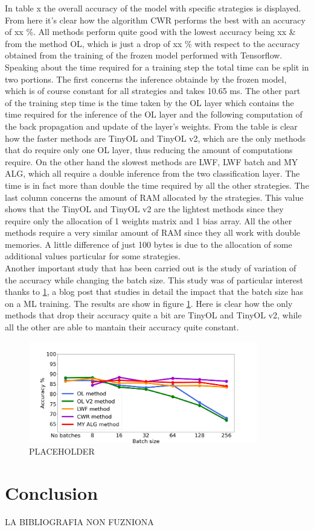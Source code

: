 \documentclass[12pt]{report}
\begin{document}
In table x the overall accuracy of the model with specific strategies is displayed. From here it's clear how the algorithm CWR performs the best with an accuracy of xx \%. All methods perform quite good with the lowest accuracy being xx \& from the method OL, which is just a drop of xx \% with respect to the accuracy obtained from the training of the frozen model performed with Tensorflow. Speaking about the time required for a training step the total time can be split in two portions. The first concerns the inference obtainde by the frozen model, which is of course constant for all strategies and takes 10.65 ms. The other part of the training step time is the time taken by the OL layer which contains the time required for the inference of the OL layer and the following computation of the back propagation and update of the layer's weights. From the table is clear how the faster methods are TinyOL and TinyOL v2, which are the only methods that do require only one OL layer, thus reducing the amount of computations require. On the other hand the slowest methods are LWF, LWF batch and MY ALG, which all require a double inference from the two classification layer. The time is in fact more than double the time required by all the other strategies. The last column concerns the amount of RAM allocated by the strategies. This value shows that the TinyOL and TinyOL v2 are the lightest methods since they require only the allocation of 1 weights matrix and 1 bias array. All the other methods require a very similar amount of RAM since they all work with double memories. A little difference of just 100 bytes is due to the allocation of some additional values particular for some strategies.  \\
Another important study that has been carried out is the study of variation of the accuracy while changing the batch size. This study was of particular interest thanks to \ref{}, a blog post that studies in detail the impact that the batch size has on a ML training. The results are show in figure \ref{fig:batch_size_letter}. Here is clear how the only methods that drop their accuracy quite a bit are TinyOL and TinyOL v2, while all the other are able to mantain their accuracy quite constant.
%
\begin{figure}[h!]
    \centering
    \includegraphics[width=100mm]{Figures/Chapter5/batch_size_letters.png} 
    \caption{PLACEHOLDER}
    \label{fig:batch_size_letter}    
\end{figure}
%

\chapter{Conclusion}






LA BIBLIOGRAFIA NON FUZNIONA
\printbibliography
\end{document}
